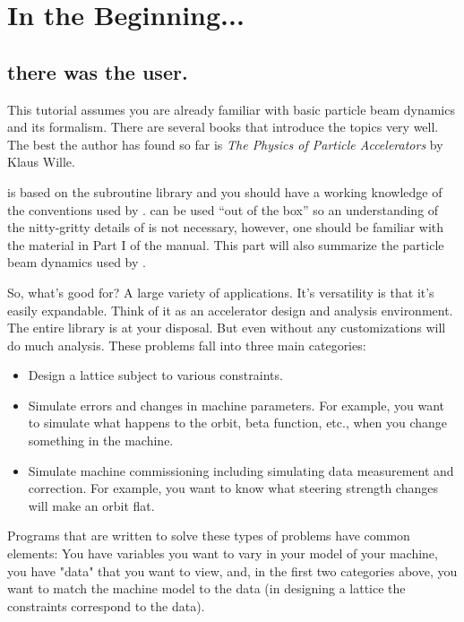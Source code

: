 \section{In the Beginning...}
\label{s:beginning}

\subsection{there was the user.}

This tutorial assumes you are already familiar with basic particle
beam dynamics and its formalism. There are several books that
introduce the topics very well. The best the author has found so far
is \textit{The Physics of Particle Accelerators} by Klaus Wille.

\tao is based on the \bmad subroutine library and you should have a
working knowledge of the conventions used by \bmad. \tao can be used
``out of the box'' so an understanding of the nitty-gritty details of
\bmad is not necessary, however, one should be familiar with the
material in Part I of the \bmad manual. This part will also summarize
the particle beam dynamics used by \tao.

So, what's \tao good for? A large variety of applications. It's
versatility is that it's easily expandable. Think of it as an
accelerator design and analysis environment. The entire \bmad library
is at your disposal. But even without any customizations \tao will do
much analysis. These problems fall into three main categories:

\begin{itemize}
\item 
Design a lattice subject to various constraints.
\item
Simulate errors and changes in machine parameters. For example, you want to
simulate what happens to the orbit, beta function, etc., when you change
something in the machine. 
\item 
Simulate machine commissioning including simulating data measurement and
correction. For example, you want to know what steering strength changes will
make an orbit flat.
\end{itemize}

Programs that are written to solve these types of problems have common
elements: You have variables you want to vary in your model of your
machine, you have "data" that you want to view, and, in the first two
categories above, you want to match the machine model to the data (in
designing a lattice the constraints correspond to the data).

